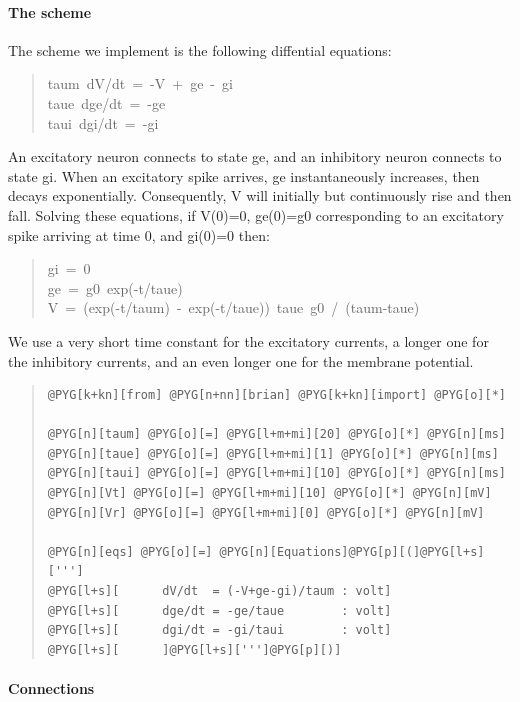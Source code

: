 \documentclass[letterpaper,10pt,english]{manual}
\begin{document}
\paragraph{The scheme}

The scheme we implement is the following diffential equations:
\begin{quote}
{\raggedright{}taum~dV/dt~=~-V~+~ge~-~gi\\
taue~dge/dt~=~-ge\\
taui~dgi/dt~=~-gi}
\end{quote}

An excitatory neuron connects to state ge, and an inhibitory neuron connects
to state gi. When an excitatory spike arrives, ge instantaneously increases,
then decays exponentially. Consequently, V will initially but continuously
rise and then fall. Solving these equations, if V(0)=0, ge(0)=g0 corresponding
to an excitatory spike arriving at time 0, and gi(0)=0 then:
\begin{quote}
{\raggedright{}gi~=~0\\
ge~=~g0~exp(-t/taue)\\
V~=~(exp(-t/taum)~-~exp(-t/taue))~taue~g0~/~(taum-taue)}
\end{quote}

We use a very short time constant for the excitatory currents, a longer one
for the inhibitory currents, and an even longer one for the membrane
potential.
\begin{quote}

\begin{Verbatim}[commandchars=@\[\]]
@PYG[k+kn][from] @PYG[n+nn][brian] @PYG[k+kn][import] @PYG[o][*]

@PYG[n][taum] @PYG[o][=] @PYG[l+m+mi][20] @PYG[o][*] @PYG[n][ms]
@PYG[n][taue] @PYG[o][=] @PYG[l+m+mi][1] @PYG[o][*] @PYG[n][ms]
@PYG[n][taui] @PYG[o][=] @PYG[l+m+mi][10] @PYG[o][*] @PYG[n][ms]
@PYG[n][Vt] @PYG[o][=] @PYG[l+m+mi][10] @PYG[o][*] @PYG[n][mV]
@PYG[n][Vr] @PYG[o][=] @PYG[l+m+mi][0] @PYG[o][*] @PYG[n][mV]

@PYG[n][eqs] @PYG[o][=] @PYG[n][Equations]@PYG[p][(]@PYG[l+s][''']
@PYG[l+s][      dV/dt  = (-V+ge-gi)/taum : volt]
@PYG[l+s][      dge/dt = -ge/taue        : volt]
@PYG[l+s][      dgi/dt = -gi/taui        : volt]
@PYG[l+s][      ]@PYG[l+s][''']@PYG[p][)]
\end{Verbatim}
\end{quote}


\paragraph{Connections}
\end{document}
